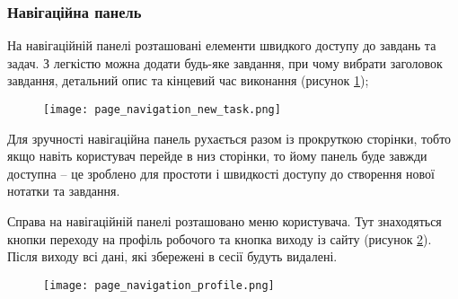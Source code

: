 \subsubsection{Навігаційна панель}
\par На навігаційній панелі розташовані елементи швидкого доступу до завдань та задач.
З легкістю можна додати будь-яке завдання, при чому вибрати заголовок завдання, детальний опис та кінцевий час виконання (рисунок \ref{pic:page_navigation_new_task});
\begin{figure}[!ht]
\centering
    \texttt{[image: page\_navigation\_new\_task.png]}
    \label{pic:page_navigation_new_task}
\end{figure}
\par Для зручності навігаційна панель рухається разом із прокруткою сторінки, тобто якщо навіть користувач перейде в низ сторінки, то йому панель буде завжди доступна -- це зроблено для простоти і швидкості доступу до створення нової нотатки та завдання.
\par Справа на навігаційній панелі розташовано меню користувача. Тут знаходяться кнопки переходу на профіль робочого та кнопка виходу із сайту (рисунок \ref{pic:page_navigation_profile}). Після виходу всі дані, які збережені в сесії будуть видалені.
\begin{figure}[!ht]
\centering
    \texttt{[image: page\_navigation\_profile.png]}
    \label{pic:page_navigation_profile}
\end{figure}


